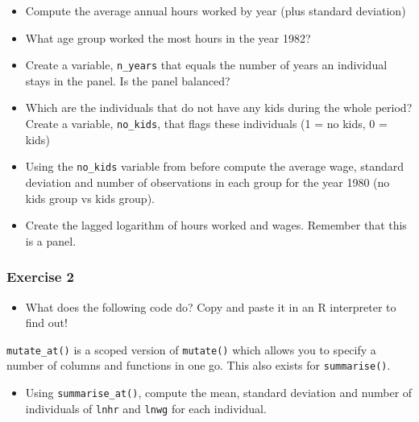 \documentclass[]{gitbook}
\newenvironment{Shaded}{\begin{snugshade}}{\end{snugshade}}
\newcommand{\KeywordTok}[1]{\textcolor[rgb]{0.13,0.29,0.53}{\textbf{#1}}}
\newcommand{\NormalTok}[1]{#1}
\newcommand{\OperatorTok}[1]{\textcolor[rgb]{0.81,0.36,0.00}{\textbf{#1}}}
\newcommand{\StringTok}[1]{\textcolor[rgb]{0.31,0.60,0.02}{#1}}
\providecommand{\tightlist}{%
  \setlength{\itemsep}{0pt}\setlength{\parskip}{0pt}}
\theoremstyle{definition}
\theoremstyle{definition}
\theoremstyle{definition}
\theoremstyle{remark}
\begin{document}
\begin{itemize}
\tightlist
\item
  Compute the average annual hours worked by year (plus standard
  deviation)
\item
  What age group worked the most hours in the year 1982?
\item
  Create a variable, \texttt{n\_years} that equals the number of years
  an individual stays in the panel. Is the panel balanced?
\item
  Which are the individuals that do not have any kids during the whole
  period? Create a variable, \texttt{no\_kids}, that flags these
  individuals (1 = no kids, 0 = kids)
\item
  Using the \texttt{no\_kids} variable from before compute the average
  wage, standard deviation and number of observations in each group for
  the year 1980 (no kids group vs kids group).
\item
  Create the lagged logarithm of hours worked and wages. Remember that
  this is a panel.
\end{itemize}

\hypertarget{exercise-2-1}{%
\subsubsection*{Exercise 2}\label{exercise-2-1}}

\begin{itemize}
\tightlist
\item
  What does the following code do? Copy and paste it in an R interpreter
  to find out!
\end{itemize}

\begin{Shaded}
\end{Shaded}

\texttt{mutate\_at()} is a scoped version of \texttt{mutate()} which
allows you to specify a number of columns and functions in one go. This
also exists for \texttt{summarise()}.

\begin{itemize}
\tightlist
\item
  Using \texttt{summarise\_at()}, compute the mean, standard deviation
  and number of individuals of \texttt{lnhr} and \texttt{lnwg} for each
  individual.
\end{itemize}
\end{document}

